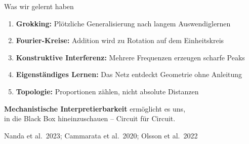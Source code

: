 \documentclass[aspectratio=169, 12pt]{beamer}
\newcommand{\quelle}[1]{{\vfill\hfill\scriptsize\color{gray}#1}}
\begin{document}
\begin{frame}{Was wir gelernt haben}
  \begin{enumerate}
    \item[\color{akzent}\textbf{1.}] \textbf{Grokking:} Pl\"otzliche Generalisierung nach langem Auswendiglernen
    \item[\color{akzent}\textbf{2.}] \textbf{Fourier-Kreise:} Addition wird zu Rotation auf dem Einheitskreis
    \item[\color{akzent}\textbf{3.}] \textbf{Konstruktive Interferenz:} Mehrere Frequenzen erzeugen scharfe Peaks
    \item[\color{akzent}\textbf{4.}] \textbf{Eigenst\"andiges Lernen:} Das Netz entdeckt Geometrie ohne Anleitung
    \item[\color{akzent}\textbf{5.}] \textbf{Topologie:} Proportionen z\"ahlen, nicht absolute Distanzen
  \end{enumerate}

  \bigskip
  \begin{center}
    \colorbox{dunkel!10}{%
      \parbox{0.8\textwidth}{\centering
        \textbf{Mechanistische Interpretierbarkeit} erm\"oglicht es uns,\\
        in die Black Box hineinzuschauen -- Circuit f\"ur Circuit.
      }%
    }
  \end{center}

  \quelle{Nanda et al.\ 2023; Cammarata et al.\ 2020; Olsson et al.\ 2022}
\end{frame}

\begin{frame}[plain]
  {
  }
\end{frame}

\end{document}
